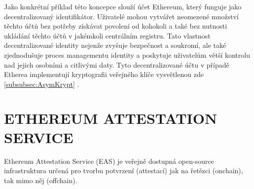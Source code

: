 Jako konkrétní příklad této koncepce slouží účet Ethereum, který funguje jako decentralizovaný identifikátor. Uživatelé mohou vytvářet neomezené množství těchto účtů bez potřeby získávat povolení od kohokoli a také bez nutnosti ukládání těchto účtů v jakémkoli centrálním registru. Tato vlastnost decentralizované identity nejenže zvyšuje bezpečnost a soukromí, ale také zjednodušuje proces managementu identity a poskytuje uživatelům větší kontrolu nad jejich osobními a citlivými daty. Tyto decentralizované účtu v případě Etherea implementují kryptografii veřejného klíče vysvětlenou zde \ref{subsubsec:AsymKrypt} . \cite{Ethereum-Identity}
















\clearpage
\section{ETHEREUM ATTESTATION SERVICE}\label{sec:eas}


Ethereum Attestation Service (EAS) je veřejně dostupná open-source infrastruktura určená pro tvorbu potvrzení (attestací) jak na řetězci (onchain), tak mimo něj (offchain).

